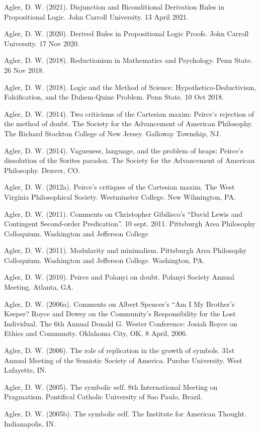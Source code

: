\documentclass[p1noheader, 11pt, darkmode]{lightcv}
\begin{document}
\begin{rlist}[Talks]
    \item Agler, D. W. (2021). Disjunction and Biconditional Derivation Rules in Propositional Logic. John Carroll University. 13 April 2021.
    \item Agler, D. W. (2020). Derived Rules in Propositional Logic Proofs. John Carroll University. 17 Nov 2020.
    \item Agler, D. W. (2018). Reductionism in Mathematics and Psychology. Penn State. 26 Nov 2018.
    \item Agler, D. W. (2018). Logic and the Method of Science: Hypothetico-Deductivism, Falsification, and the Duhem-Quine Problem. Penn State. 10 Oct 2018.
    \item Agler, D. W. (2014). Two criticisms of the Cartesian maxim: Peirce’s rejection of the method of doubt. The Society for the Advancement of American Philosophy. The Richard Stockton College of New Jersey. Galloway Township, NJ.
    \item Agler, D. W. (2014). Vagueness, language, and the problem of heaps: Peirce’s dissolution of the Sorites paradox. The Society for the Advancement of American Philosophy. Denver, CO.
    \item Agler, D. W. (2012a). Peirce’s critiques of the Cartesian maxim. The West Virginia Philosophical Society. Westminster College. New Wilmington, PA.
    \item Agler, D. W. (2011). Comments on Christopher Gibilisco’s “David Lewis and Contingent Second-order
    Predication”. 10 sept. 2011. Pittsburgh Area Philosophy Colloquium. Washington and Jeﬀerson
    College
    \item Agler, D. W. (2011). Modularity and minimalism. Pittsburgh Area Philosophy Colloquium. Washington and Jefferson College. Washington, PA.
    \item Agler, D. W. (2010). Peirce and Polanyi on doubt. Polanyi Society Annual Meeting. Atlanta, GA.
    \item Agler, D. W. (2006a). Comments on Albert Spencer’s “Am I My Brother’s Keeper? Royce and Dewey on the Community’s Responsibility for the Lost Individual. The 6th Annual Donald G. Wester Conference: Josiah Royce on Ethics and Community. Oklahoma City, OK. 8 April, 2006.
    \item Agler, D. W. (2006). The role of replication in the growth of symbols. 31st Annual Meeting of the Semiotic Society of America. Purdue University. West Lafayette, IN.
    \item Agler, D. W. (2005). The symbolic self. 8th International Meeting on Pragmatism. Pontifical Catholic University of Sao Paulo, Brazil.
    \item Agler, D. W. (2005b). The symbolic self. The Institute for American Thought. Indianapolis, IN.
\end{rlist}
\end{document}
